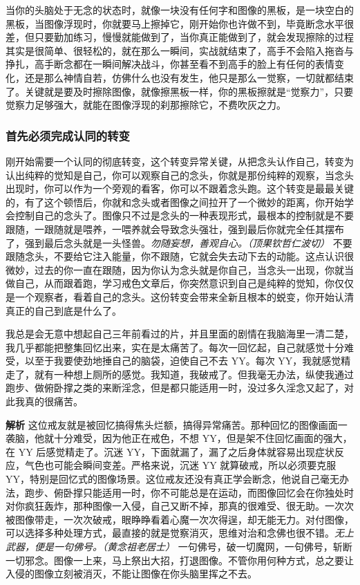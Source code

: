 当你的头脑处于无念的状态时，就像一块没有任何字和图像的黑板，是一块空白的黑板，当图像浮现时，你就要马上擦掉它，刚开始你也许做不到，毕竟断念水平很差，但只要勤加练习，慢慢就能做到了，当你真正能做到了，就会发现擦除的过程其实是很简单、很轻松的，就在那么一瞬间，实战就结束了，高手不会陷入拖沓与挣扎，高手断念都在一瞬间解决战斗，你甚至看不到高手的脸上有任何的表情变化，还是那么神情自若，仿佛什么也没有发生，他只是那么一觉察，一切就都结束了。关键就是要及时擦除图像，就像擦黑板一样，你的黑板擦就是“觉察力”，只要觉察力足够强大，就能在图像浮现的刹那擦除它，不费吹灰之力。

\subsubsection{首先必须完成认同的转变}

刚开始需要一个认同的彻底转变，这个转变异常关键，从把念头认作自己，转变为认出纯粹的觉知是自己，你可以观察自己的念头，你就是那份纯粹的观察，当念头出现时，你可以作为一个旁观的看客，你可以不跟着念头跑。这个转变是最最关键的，有了这个顿悟后，你就和念头或者图像之间拉开了一个微妙的距离，你开始学会控制自己的念头了。图像只不过是念头的一种表现形式，最根本的控制就是不要跟随，一跟随就是喂养，一喂养就会导致念头强壮，强到最后你就完全任其摆布了，强到最后念头就是一头怪兽。\textit{勿随妄想，善观自心。（顶果钦哲仁波切）} 不要跟随念头，不要给它注入能量，你不跟随，它就会失去动下去的动能。这点认识很微妙，过去的你一直在跟随，因为你认为念头就是你自己，当念头一出现，你就当做自己，从而跟着跑，学习戒色文章后，你突然意识到自己是纯粹的觉知，你仅仅是一个观察者，看着自己的念头。这份转变会带来全新且根本的蜕变，你开始认清真正的自己到底是什么了。

\begin{case}
    我总是会无意中想起自己三年前看过的片，并且里面的剧情在我脑海里一清二楚，我几乎都能把整集回忆出来，实在是太痛苦了。每次一回忆起，自己就感觉十分难受，以至于我要使劲地捶自己的脑袋，迫使自己不去 YY。每次 YY，我就感觉精走了，就有一种想上厕所的感觉。我知道，我破戒了。但我毫无办法，纵使我通过跑步、做俯卧撑之类的来断淫念，但是都只能适用一时，没过多久淫念又起了，对此我真的很痛苦。

    \textbf{解析} 这位戒友就是被回忆搞得焦头烂额，搞得异常痛苦。那种回忆的图像画面一袭脑，他就十分难受，因为他正在戒色，不想 YY，但是架不住回忆画面的强大，在 YY 后感觉精走了。沉迷 YY，下面就漏了，漏了之后身体就容易出现症状反应，气色也可能会瞬间变差。严格来说，沉迷 YY 就算破戒，所以必须要克服 YY，特别是回忆式的图像场景。这位戒友还没有真正学会断念，他说自己毫无办法，跑步、俯卧撑只能适用一时，你不可能总是在运动，而图像回忆会在你独处时对你疯狂轰炸，那种图像一入侵，自己又断不掉，那真的很难受、很无助。一次次被图像带走，一次次破戒，眼睁睁看着心魔一次次得逞，却无能无力。对付图像，可以选择多种处理方式，最直接的就是觉察消灭，思维对治和念佛也很不错。\textit{无上武器，便是一句佛号。（黄念祖老居士）} 一句佛号，破一切魔网，一句佛号，斩断一切邪念。图像一上来，马上祭出大招，打退图像。不管你用何种方式，总之要让入侵的图像立刻被消灭，不能让图像在你头脑里挥之不去。
\end{case}

